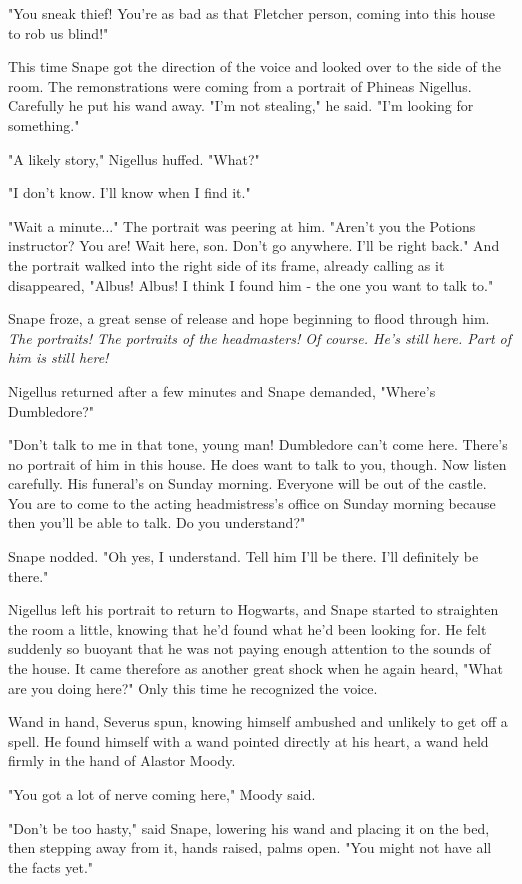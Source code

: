 \documentclass[a4paper,11pt]{article}
\begin{document}
"You sneak thief! You're as bad as that Fletcher person, coming into this house to rob us blind!"

This time Snape got the direction of the voice and looked over to the side of the room. The remonstrations were coming from a portrait of Phineas Nigellus. Carefully he put his wand away. "I'm not stealing," he said. "I'm looking for something."

"A likely story," Nigellus huffed. "What?"

"I don't know. I'll know when I find it."

"Wait a minute..." The portrait was peering at him. "Aren't you the Potions instructor? You are! Wait here, son. Don't go anywhere. I'll be right back." And the portrait walked into the right side of its frame, already calling as it disappeared, "Albus! Albus! I think I found him - the one you want to talk to."

Snape froze, a great sense of release and hope beginning to flood through him. \emph{The portraits! The portraits of the headmasters! Of course. He's still here. Part of him is still here!}

Nigellus returned after a few minutes and Snape demanded, "Where's Dumbledore?"

"Don't talk to me in that tone, young man! Dumbledore can't come here. There's no portrait of him in this house. He does want to talk to you, though. Now listen carefully. His funeral's on Sunday morning. Everyone will be out of the castle. You are to come to the acting headmistress's office on Sunday morning because then you'll be able to talk. Do you understand?"

Snape nodded. "Oh yes, I understand. Tell him I'll be there. I'll definitely be there."

Nigellus left his portrait to return to Hogwarts, and Snape started to straighten the room a little, knowing that he'd found what he'd been looking for. He felt suddenly so buoyant that he was not paying enough attention to the sounds of the house. It came therefore as another great shock when he again heard, "What are you doing here?" Only this time he recognized the voice.

Wand in hand, Severus spun, knowing himself ambushed and unlikely to get off a spell. He found himself with a wand pointed directly at his heart, a wand held firmly in the hand of Alastor Moody.

"You got a lot of nerve coming here," Moody said.

"Don't be too hasty," said Snape, lowering his wand and placing it on the bed, then stepping away from it, hands raised, palms open. "You might not have all the facts yet."
\end{document}
